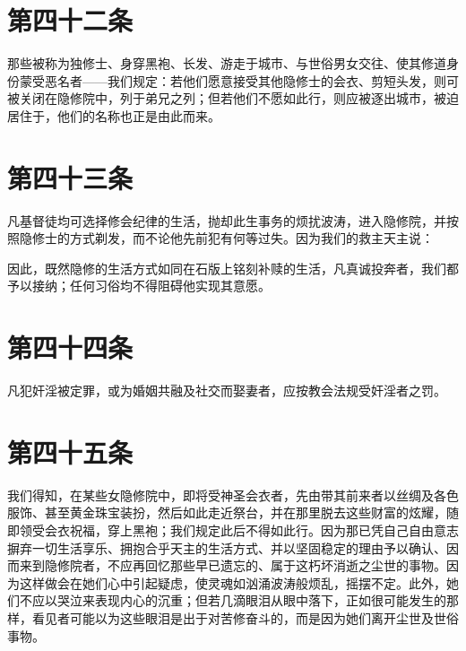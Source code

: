 \section{第四十二条}

那些被称为独修士、身穿黑袍、长发、游走于城市、与世俗男女交往、使其修道身份蒙受恶名者——我们规定：若他们愿意接受其他隐修士的会衣、剪短头发，则可被关闭在隐修院中，列于弟兄之列；但若他们不愿如此行，则应被逐出城市，被迫居住于，他们的名称也正是由此而来。\par


\section{第四十三条}

凡基督徒均可选择修会纪律的生活，抛却此生事务的烦扰波涛，进入隐修院，并按照隐修士的方式剃发，而不论他先前犯有何等过失。因为我们的救主天主说：\par

因此，既然隐修的生活方式如同在石版上铭刻补赎的生活，凡真诚投奔者，我们都予以接纳；任何习俗均不得阻碍他实现其意愿。\par


\section{第四十四条}

凡犯奸淫被定罪，或为婚姻共融及社交而娶妻者，应按教会法规受奸淫者之罚。\par


\section{第四十五条}

我们得知，在某些女隐修院中，即将受神圣会衣者，先由带其前来者以丝绸及各色服饰、甚至黄金珠宝装扮，然后如此走近祭台，并在那里脱去这些财富的炫耀，随即领受会衣祝福，穿上黑袍；我们规定此后不得如此行。因为那已凭自己自由意志摒弃一切生活享乐、拥抱合乎天主的生活方式、并以坚固稳定的理由予以确认、因而来到隐修院者，不应再回忆那些早已遗忘的、属于这朽坏消逝之尘世的事物。因为这样做会在她们心中引起疑虑，使灵魂如汹涌波涛般烦乱，摇摆不定。此外，她们不应以哭泣来表现内心的沉重；但若几滴眼泪从眼中落下，正如很可能发生的那样，看见者可能以为这些眼泪是出于对苦修奋斗的，而是因为她们离开尘世及世俗事物。\par

